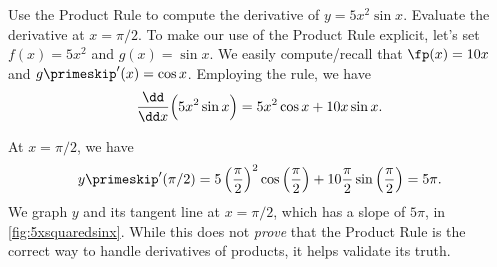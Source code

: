 \begin{example}\label{ex_prod1}
Use the Product Rule to compute the derivative of $y=5x^2\sin x$. Evaluate the derivative at $x=\pi/2$.
\solution
To make our use of the Product Rule explicit, let's set $f(x) = 5x^2$ and $g(x) = \sin x$. We easily compute/recall that $\fp(x) = 10x$ and $g\primeskip'(x) = \cos x$. Employing the rule, we have
\[\frac{\dd}{\dd x}\Bigl(5x^2\sin x\Bigr) = 5x^2\cos x + 10x\sin x.\]


At $x=\pi/2$, we have
\[y\primeskip'(\pi/2) = 5\left(\frac{\pi}{2}\right)^2\cos \left(\frac{\pi}2\right) + 10\frac{\pi}2 \sin\left(\frac{\pi}{2}\right) = 5\pi.\]
We graph $y$ and its tangent line at $x=\pi/2$, which has a slope of $5\pi$, in \autoref{fig:5xsquaredsinx}. While this does not \emph{prove} that the Product Rule is the correct way to handle derivatives of products, it helps validate its truth.
\end{example}

